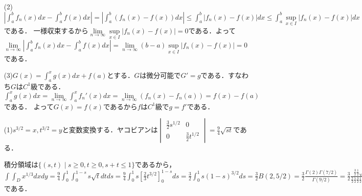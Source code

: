 \documentclass[
		book,
		head_space=20mm,
		foot_space=20mm,
		gutter=10mm,
		line_length=190mm
]{jlreq}
\begin{document}
(2)$|\int_a^b f_n(x)dx-\int_a^b f(x)dx|=|\int_a^b (f_n(x)-f(x))dx|\le \int_a^b |f_n(x)-f(x)|dx \le \int_a^b \sup\limits_{x \in I} |f_n(x)-f(x)|dx \le (b-a)\sup\limits_{x \in I} |f_n(x)-f(x)|$である．
一様収束するから$\lim\limits_{n \to \infty} \sup\limits_{x \in I} |f_n(x)-f(x)|=0$である．よって$\lim\limits_{n \to \infty} |\int_a^b f_n(x)dx-\int_a^b f(x)dx|=\lim\limits_{n \to \infty} (b-a)\sup\limits_{x \in I} |f_n(x)-f(x)|=0$である．

(3)$G(x)=\int_a^x g(x)dx+f(a)$とする．$G$は微分可能で$G'=g$である．すなわち$G$は$C^1$級である．$\int_a^x g(x)dx=\lim\limits_{n\to\infty} \int_a^x f_n'(x)dx=\lim\limits_{n\to\infty} (f_n(x)-f_n(a))=f(x)-f(a)$である．
よって$G(x)=f(x)$であるから$f$は$C^1$級で$g=f'$である．

(1)$s^{3/2}=x,t^{3/2}=y$と変数変換する．ヤコビアンは$\begin{vmatrix}
	\frac{3}{2}s^{1/2} & 0 \\
	0 & \frac{3}{2}t^{1/2}
\end{vmatrix}=\frac{9}{4}\sqrt{st}$である．

積分領域は$\{ (s,t) \mid s\ge 0,t \ge 0,s+t \le1\}$であるから，
$\int\int_D x^{1/3}dxdy=\frac{9}{4}\int_0^1 \int_0^{1-s} s\sqrt{t}dtds=\frac{9}{4}\int_0^1 s\left[ \frac{2}{3}t^{3/2}\right]_0^{1-s}ds=\frac{3}{2}\int_0^1 s(1-s)^{3/2}ds=\frac{3}{2}B(2,5/2)=\frac{3}{2}\frac{\Gamma(2)\Gamma(7/2)}{\Gamma(9/2)}=\frac{3}{2}\frac{\frac{3}{2}\frac{1}{2}\sqrt{\pi}}{\frac{7}{2}\frac{5}{2}\frac{3}{2}\frac{1}{2}\sqrt{\pi}}=\frac{6}{35}$である．
\end{document}
